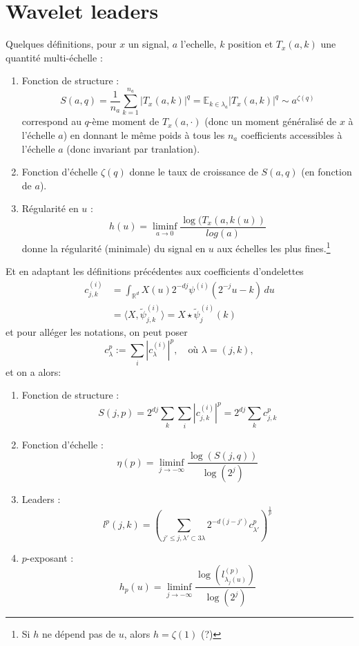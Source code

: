 \documentclass[11pt]{article} %
\begin{document}
\section{Wavelet leaders}
	Quelques définitions, pour $x$ un signal, $a$ l'echelle, $k$ position et $T_x(a,k)$ une quantité multi-échelle :
	\begin{enumerate}
		\item Fonction de structure :
			\begin{equation}
				S(a,q) = \frac{1}{n_a}\sum_{k=1}^{n_a} |T_x(a,k)|^q = \mathbb{E}_{k\in\lambda_a} |T_x(a,k)|^q \sim a^{\zeta(q)}
			\end{equation}
			correspond au $q$-ème moment de $T_x(a,\cdot)$ (donc un moment généralisé de $x$ à l'échelle $a$) en donnant le même poids à tous les $n_a$ coefficients accessibles à l'échelle $a$ (donc invariant par tranlation). 
		\item Fonction d'échelle $\zeta(q)$ donne le taux de croissance de $S(a,q)$ (en fonction de $a$).
		\item Régularité en $u$ :
			\begin{equation}
				h(u) = \liminf_{a\to 0} \frac{\log(T_x(a, k(u))}{log(a)}
			\end{equation}
			donne la régularité (minimale) du signal en $u$ aux échelles les plus fines.\footnote{Si $h$ ne dépend pas de $u$, alors $h = \zeta(1)$ (?)} 
	\end{enumerate}
	Et en adaptant les définitions précédentes aux coefficients d'ondelettes
	\begin{align}
		c_{j,k}^{(i)} 	&= \int_{\mathbb{R}^d} X(u)2^{-dj}\psi^{(i)}(2^{-j}u -k) \,du\\
					&= \langle X, \tilde\psi_{j,k}^{(i)} \rangle = X\star \tilde\psi_{j}^{(i)}(k)
	\end{align}
	et pour alléger les notations, on peut poser
	\begin{equation}
		c_{\lambda}^p := \sum_i |c_{\lambda}^{(i)}|^p,\quad\text{où $\lambda=(j,k) $},
	\end{equation}
	 et on a alors:
	\begin{enumerate}
		\item Fonction de structure :
			\begin{equation}
				S(j,p) = 2^{dj}\sum_k\sum_i |c_{j,k}^{(i)}|^p = 2^{dj}\sum_k c_{j,k}^p
			\end{equation}
		\item Fonction d'échelle :
			\begin{equation}
				\eta(p) = \liminf_{j\to-\infty} \frac{\log(S(j,q))}{\log(2^j)}
			\end{equation}
		\item Leaders :
			\begin{equation}
				l^p(j,k) = \left( \sum_{j'\leq j, \lambda'\subset 3\lambda} 2^{-d(j-j')} c_{\lambda'}^p \right)^{\frac{1}{p}}
			\end{equation}
		\item $p$-exposant :
			\begin{equation}
				h_p(u) = \liminf_{j\to -\infty} \frac{\log(l_{\lambda_j(u)}^{(p)})}{\log(2^j)}
			\end{equation}
	\end{enumerate}
\end{document}
